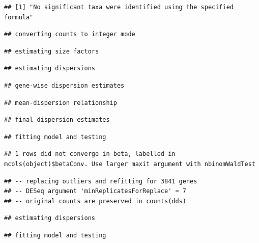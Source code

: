 \documentclass[]{article}
\begin{document}
\begin{verbatim}
## [1] "No significant taxa were identified using the specified formula"
\end{verbatim}

\begin{verbatim}
## converting counts to integer mode
\end{verbatim}

\begin{verbatim}
## estimating size factors
\end{verbatim}

\begin{verbatim}
## estimating dispersions
\end{verbatim}

\begin{verbatim}
## gene-wise dispersion estimates
\end{verbatim}

\begin{verbatim}
## mean-dispersion relationship
\end{verbatim}

\begin{verbatim}
## final dispersion estimates
\end{verbatim}

\begin{verbatim}
## fitting model and testing
\end{verbatim}

\begin{verbatim}
## 1 rows did not converge in beta, labelled in mcols(object)$betaConv. Use larger maxit argument with nbinomWaldTest
\end{verbatim}

\begin{verbatim}
## -- replacing outliers and refitting for 3841 genes
## -- DESeq argument 'minReplicatesForReplace' = 7 
## -- original counts are preserved in counts(dds)
\end{verbatim}

\begin{verbatim}
## estimating dispersions
\end{verbatim}

\begin{verbatim}
## fitting model and testing
\end{verbatim}
\end{document}
